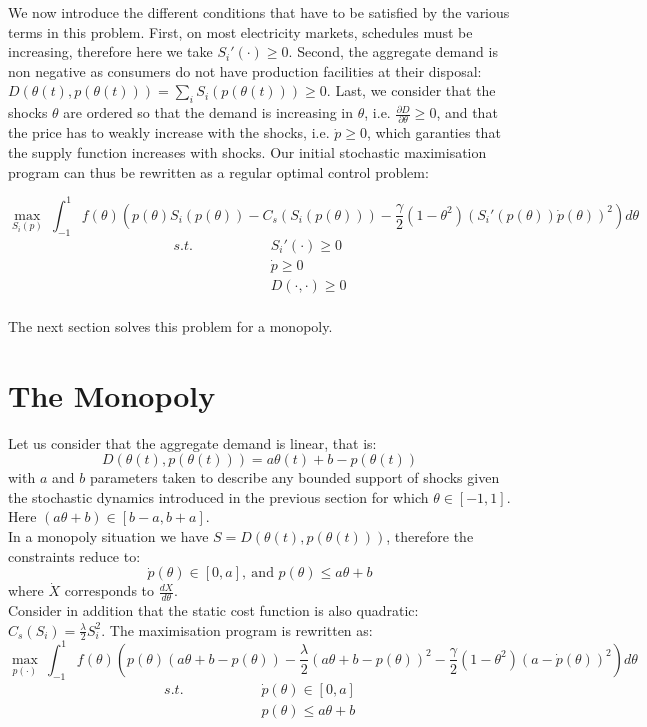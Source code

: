 We now introduce the different conditions that have to be satisfied by the various terms in this problem. First, on most electricity markets, schedules must be increasing, therefore here we take $S_i'(\cdot)\geq0$. Second, the aggregate demand is non negative as consumers do not have production facilities at their disposal: $D(\theta(t),p(\theta(t)))=\sum_iS_i(p(\theta(t)))\geq0$. Last, we consider that the shocks $\theta$ are ordered so that the demand is increasing in $\theta$, i.e. $\frac{\partial D}{\partial\theta}\geq0$, and that the price has to weakly increase with the shocks, i.e. $\dot{p}\geq0$, which garanties that the supply function increases with shocks. Our initial stochastic maximisation program can thus be rewritten as a regular optimal control problem: 

\begin{equation}
\displaystyle{\max_{S_i(p)}}~\int_{-1}^{1} f(\theta)\left(p(\theta)S_i(p(\theta)) -C_s(S_i(p(\theta)))-\frac{\gamma}{2}(1-\theta^2)\left(S_i'(p(\theta))\dot{p}(\theta)\right)^2\right)d\theta
\end{equation}
\begin{eqnarray} 
s.t.\hspace{2cm}&S_i'(\cdot)\geq0 \nonumber\\
&\dot{p}\geq0\\
&D(\cdot,\cdot)\geq0 \nonumber\\
\end{eqnarray}

The next section solves this problem for a monopoly. 



\section{The Monopoly}\label{monosolve}
Let us consider that the aggregate demand is linear, that is: $$D(\theta(t),p(\theta(t)))=a\theta(t)+b-p(\theta(t))$$
with $a$ and $b$ parameters taken to describe any bounded support of shocks given the stochastic dynamics introduced in the previous section for which $\theta\in[-1,1]$. Here $(a\theta+b)\in[b-a,b+a]$.\\

In a monopoly situation we have $S=D(\theta(t),p(\theta(t)))$, therefore the constraints reduce to: $$\dot{p}(\theta)\in[0,a],~\textrm{and }p(\theta)\leq a\theta+b$$
where $\dot{X}$ corresponds to $\frac{dX}{d\theta}$. \\

Consider in addition that the static cost function is also quadratic: $C_s(S_i)=\frac{\lambda}{2}S_i^2$. The maximisation program is rewritten as: 
\begin{equation}
\displaystyle{\max_{p(\cdot)}}~\int_{-1}^{1} f(\theta)\left(p(\theta)(a\theta+b-p(\theta)) -\frac{\lambda}{2}(a\theta+b-p(\theta))^2-\frac{\gamma}{2}(1-\theta^2)\left(a-\dot{p}(\theta)\right)^2\right)d\theta
\end{equation}
\begin{eqnarray}
s.t.\hspace{2cm}&\dot{p}(\theta)\in[0,a] \nonumber\\
&p(\theta)\leq a\theta+b \nonumber
\end{eqnarray}


